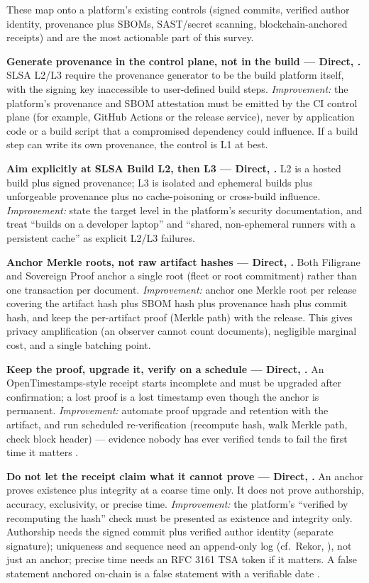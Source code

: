 \documentclass[11pt]{article}
\begin{document}
These map onto a platform's existing controls (signed commits, verified
author identity, provenance plus SBOMs, SAST/secret scanning,
blockchain-anchored receipts) and are the most actionable part of this
survey.

\textbf{Generate provenance in the control plane, not in the build ---
Direct, \cite{slsa}.} SLSA L2/L3 require the provenance generator to be
the build platform itself, with the signing key inaccessible to
user-defined build steps. \emph{Improvement:} the platform's
provenance and SBOM attestation must be emitted by the CI control plane
(for example, GitHub Actions or the release service), never by
application code or a build script that a compromised dependency could
influence. If a build step can write its own provenance, the control is
L1 at best.

\textbf{Aim explicitly at SLSA Build L2, then L3 --- Direct,
\cite{slsa}.} L2 is a hosted build plus signed provenance; L3 is
isolated and ephemeral builds plus unforgeable provenance plus no
cache-poisoning or cross-build influence. \emph{Improvement:} state the
target level in the platform's security documentation, and treat
``builds on a developer laptop'' and ``shared, non-ephemeral runners
with a persistent cache'' as explicit L2/L3 failures.

\textbf{Anchor Merkle roots, not raw artifact hashes --- Direct,
\cite{filigrane2026,sovereign2026}.} Both Filigrane and Sovereign Proof
anchor a single root (fleet or root commitment) rather than one
transaction per document. \emph{Improvement:} anchor one Merkle root
per release covering the artifact hash plus SBOM hash plus provenance
hash plus commit hash, and keep the per-artifact proof (Merkle path)
with the release. This gives privacy amplification (an observer cannot
count documents), negligible marginal cost, and a single batching point.

\textbf{Keep the proof, upgrade it, verify on a schedule --- Direct,
\cite{filigrane2026}.} An OpenTimestamps-style receipt starts
incomplete and must be upgraded after confirmation; a lost proof is a
lost timestamp even though the anchor is permanent. \emph{Improvement:}
automate proof upgrade and retention with the artifact, and run
scheduled re-verification (recompute hash, walk Merkle path, check
block header) --- evidence nobody has ever verified tends to fail the
first time it matters \cite{filigrane2026}.

\textbf{Do not let the receipt claim what it cannot prove --- Direct,
\cite{filigrane2026,stamp}.} An anchor proves existence plus integrity
at a coarse time only. It does not prove authorship, accuracy,
exclusivity, or precise time. \emph{Improvement:} the platform's
``verified by recomputing the hash'' check must be presented as
existence and integrity only. Authorship needs the signed commit plus
verified author identity (separate signature); uniqueness and sequence
need an append-only log (cf.\ Rekor, \cite{sigstore-guide}), not just an
anchor; precise time needs an RFC 3161 TSA token if it matters. A false
statement anchored on-chain is a false statement with a verifiable date
\cite{filigrane2026}.
\end{document}
